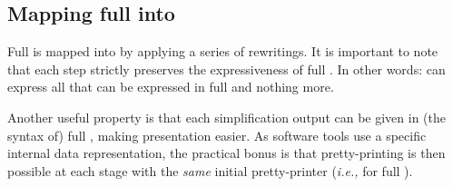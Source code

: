 \subsection{Mapping full \ASN into \core}
\label{mapping}

Full \ASN is mapped into \core by applying a series of rewritings.  It
is important to note that each step strictly preserves the
expressiveness of full \ASN. In other words: \core can express all
that can be expressed in full \ASN and nothing more.

Another useful property is that each simplification output can be
given in (the syntax of) full \ASN, making presentation easier. As
software tools use a specific internal data representation, the
practical bonus is that pretty-printing is then possible at each stage
with the \emph{same} initial pretty-printer (\emph{i.e.,} for full
\ASN).

